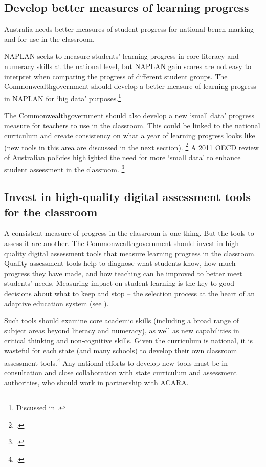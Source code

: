 \subsection{Develop better measures of learning progress}\label{subsec:national-measure}

Australia needs better measures of student progress for national bench-marking and for use in the classroom.

NAPLAN seeks to measure students' learning progress in core literacy and numeracy skills at the national level, but NAPLAN gain scores are not easy to interpret when comparing the progress of different student groups. The Commonwealth\space government should develop a better measure of learning progress in NAPLAN for `big data' purposes.\footnote{Discussed in \textcite{Goss2016Wideninggapswhat}.}

The Commonwealth\space government should also develop a new `small data' progress measure for teachers to use in the classroom. This could be linked to the national curriculum and create consistency on what a year of learning progress looks like (new tools in this area are discussed in the next section).%
  \footcite{Goss2016Wideninggapswhat}
A 2011 OECD review of Australian policies highlighted the need for more `small data' to enhance student assessment in the classroom.%
  \footcite{OECD2011ReviewsofEvaluationandAssessmentinEducationAustralia}

\subsection{Invest in high-quality digital assessment tools for the classroom}\label{subsec:new-digital}

A consistent measure of progress in the classroom is one thing. But the tools to assess it are another. The Commonwealth\space government should invest in high-quality digital assessment tools that measure learning progress in the classroom. Quality assessment tools help to diagnose what students know, how much progress they have made, and how teaching can be improved to better meet students' needs. Measuring impact on student learning is the key to good decisions about what to keep and stop -- the selection process at the heart of an adaptive education system (see ).

Such tools should examine core academic skills (including a broad range of subject areas beyond literacy and numeracy), as well as new capabilities in critical thinking and non-cognitive skills. Given the curriculum is national, it is wasteful for each state (and many schools) to develop their own classroom assessment tools.\footcite{Goss2015TargetedTeachingHow} Any national efforts to develop new tools must be in consultation and close collaboration with state curriculum and assessment authorities, who should work in partnership with ACARA.


